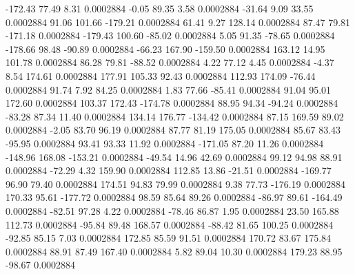      -172.43       77.49        8.31     0.0002884
       -0.05       89.35        3.58     0.0002884
      -31.64        9.09       33.55     0.0002884
       91.06      101.66     -179.21     0.0002884
       61.41        9.27      128.14     0.0002884
       87.47       79.81     -171.18     0.0002884
     -179.43      100.60      -85.02     0.0002884
        5.05       91.35      -78.65     0.0002884
     -178.66       98.48      -90.89     0.0002884
      -66.23      167.90     -159.50     0.0002884
      163.12       14.95      101.78     0.0002884
       86.28       79.81      -88.52     0.0002884
        4.22       77.12        4.45     0.0002884
       -4.37        8.54      174.61     0.0002884
      177.91      105.33       92.43     0.0002884
      112.93      174.09      -76.44     0.0002884
       91.74        7.92       84.25     0.0002884
        1.83       77.66      -85.41     0.0002884
       91.04       95.01      172.60     0.0002884
      103.37      172.43     -174.78     0.0002884
       88.95       94.34      -94.24     0.0002884
      -83.28       87.34       11.40     0.0002884
      134.14      176.77     -134.42     0.0002884
       87.15      169.59       89.02     0.0002884
       -2.05       83.70       96.19     0.0002884
       87.77       81.19      175.05     0.0002884
       85.67       83.43      -95.95     0.0002884
       93.41       93.33       11.92     0.0002884
     -171.05       87.20       11.26     0.0002884
     -148.96      168.08     -153.21     0.0002884
      -49.54       14.96       42.69     0.0002884
       99.12       94.98       88.91     0.0002884
      -72.29        4.32      159.90     0.0002884
      112.85       13.86      -21.51     0.0002884
     -169.77       96.90       79.40     0.0002884
      174.51       94.83       79.99     0.0002884
        9.38       77.73     -176.19     0.0002884
      170.33       95.61     -177.72     0.0002884
       98.59       85.64       89.26     0.0002884
      -86.97       89.61     -164.49     0.0002884
      -82.51       97.28        4.22     0.0002884
      -78.46       86.87        1.95     0.0002884
       23.50      165.88      112.73     0.0002884
      -95.84       89.48      168.57     0.0002884
      -88.42       81.65      100.25     0.0002884
      -92.85       85.15        7.03     0.0002884
      172.85       85.59       91.51     0.0002884
      170.72       83.67      175.84     0.0002884
       88.91       87.49      167.40     0.0002884
        5.82       89.04       10.30     0.0002884
      179.23       88.95      -98.67     0.0002884
